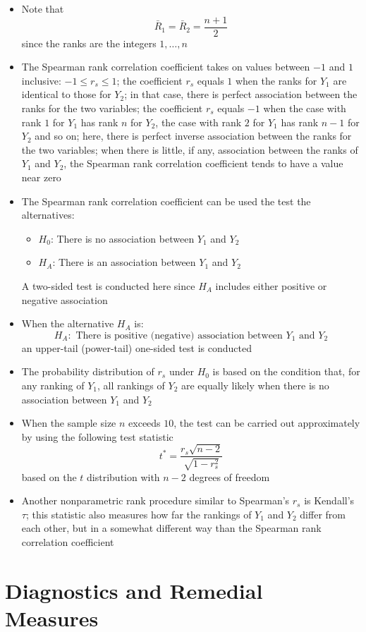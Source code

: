 \begin{itemize}
\item Note that $$ \bar{R}_1 = \bar{R}_2 = \frac{n+1}{2} $$ since the ranks are the integers $1,\dots,n$
\item The Spearman rank correlation coefficient takes on values between $-1$ and $1$ inclusive: $-1 \leq r_s \leq 1$; the coefficient $r_s$ equals $1$ when the ranks for $Y_1$ are identical to those for $Y_2$; in that case, there is perfect association between the ranks for the two variables; the coefficient $r_s$ equals $-1$ when the case with rank $1$ for $Y_1$ has rank $n$ for $Y_2$, the case with rank $2$ for $Y_1$ has rank $n-1$ for $Y_2$ and so on; here, there is perfect inverse association between the ranks for the two variables; when there is little, if any, association between the ranks of $Y_1$ and $Y_2$, the Spearman rank correlation coefficient tends to have a value near zero
\item The Spearman rank correlation coefficient can be used the test the alternatives: \begin{itemize} 
\item $H_0$: There is no association between $Y_1$ and $Y_2$ 
\item $H_A$: There is an association between $Y_1$ and $Y_2$ \end{itemize} 
A two-sided test is conducted here since $H_A$ includes either positive or negative association
\item When the alternative $H_A$ is: $$ H_A: \text{ There is positive (negative) association between $Y_1$ and $Y_2$} $$ 
an upper-tail (power-tail) one-sided test is conducted 
\item The probability distribution of $r_s$ under $H_0$ is based on the condition that, for any ranking of $Y_1$, all rankings of $Y_2$ are equally likely when there is no association between $Y_1$ and $Y_2$
\item When the sample size $n$ exceeds $10$, the test can be carried out approximately by using the following test statistic $$ t^* = \frac{r_s \sqrt{n-2}}{\sqrt{1-r_s^2}} $$ based on the $t$ distribution with $n-2$ degrees of freedom
\item Another nonparametric rank procedure similar to Spearman's $r_s$ is Kendall's $\tau$; this statistic also measures how far the rankings of $Y_1$ and $Y_2$ differ from each other, but in a somewhat different way than the Spearman rank correlation coefficient
\end{itemize}


\section{Diagnostics and Remedial Measures}

